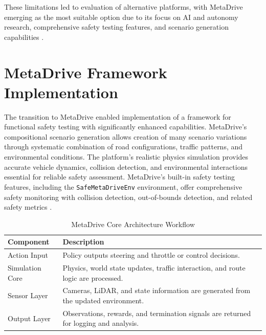 \documentclass[12pt,a4paper]{report}
\begin{document}
These limitations led to evaluation of alternative platforms, with MetaDrive emerging as the most suitable option due to its focus on AI and autonomy research, comprehensive safety testing features, and scenario generation capabilities \cite{carla_official,metadrive_docs}.

\section{MetaDrive Framework Implementation}
The transition to MetaDrive enabled implementation of a framework for functional safety testing with significantly enhanced capabilities. MetaDrive's compositional scenario generation allows creation of many scenario variations through systematic combination of road configurations, traffic patterns, and environmental conditions. The platform's realistic physics simulation provides accurate vehicle dynamics, collision detection, and environmental interactions essential for reliable safety assessment. MetaDrive's built-in safety testing features, including the \texttt{SafeMetaDriveEnv} environment, offer comprehensive safety monitoring with collision detection, out-of-bounds detection, and related safety metrics \cite{metadrive,metadrive_docs}.

\begin{table}[H]
    \centering
    \caption{MetaDrive Core Architecture Workflow}
    \label{tab:metadrive_workflow}
    \begin{tabularx}{\textwidth}{>{\raggedright\arraybackslash}p{3cm} X}
        \toprule
        Component & Description \\
        \midrule
        Action Input & Policy outputs steering and throttle or control decisions. \\
        Simulation Core & Physics, world state updates, traffic interaction, and route logic are processed. \\
        Sensor Layer & Cameras, LiDAR, and state information are generated from the updated environment. \\
        Output Layer & Observations, rewards, and termination signals are returned for logging and analysis. \\
        \bottomrule
    \end{tabularx}
\end{table}
\end{document}
